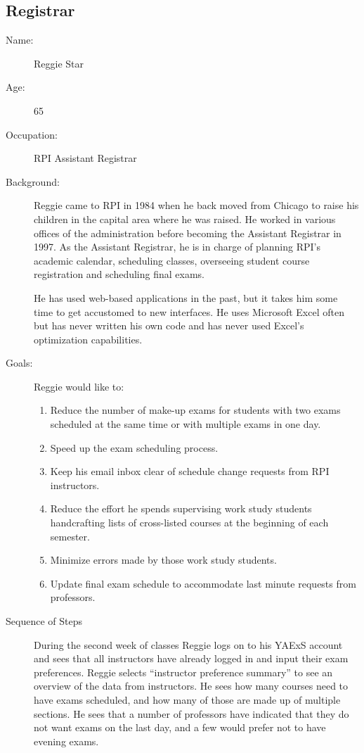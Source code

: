 \documentclass[11pt]{article}
\begin{document}
\subsection{Registrar}  %

\begin{description}
\item[Name:] Reggie Star
\item[Age:]  65
\item[Occupation:] RPI Assistant Registrar
\item[Background:] Reggie came to RPI in 1984 when he  back moved from
 Chicago to raise his children in the capital area where he was raised.
He worked in various offices of the administration before becoming
 the Assistant Registrar in 1997.  As the Assistant Registrar, he is in charge of planning RPI's academic calendar,  scheduling classes, overseeing student course registration and scheduling final exams.

He has used web-based applications in the past, but it takes him some
time to get accustomed to new interfaces.
He uses Microsoft Excel often but has never written his own code
 and has never used Excel’s optimization capabilities.

\item[Goals:]
Reggie would like to:
\begin{enumerate}
\item Reduce the number of make-up exams for students with two exams scheduled at the same time or with multiple exams in one day.
\item Speed up the exam scheduling process.
\item Keep his email inbox clear of schedule change requests from RPI instructors.
\item Reduce the effort he spends supervising work study students handcrafting lists of cross-listed courses at the beginning of each semester.
\item Minimize errors made by those work study students.
\item Update final exam schedule to accommodate last minute requests
from professors.
\end{enumerate}

\item[Sequence of Steps]
During the second week of classes Reggie logs on to his YAExS account and
 sees that all instructors have already logged in and input their
 exam preferences.
Reggie selects “instructor preference summary”  to see an overview of
 the data from instructors. He sees how many courses need to have exams
 scheduled, and how many of those are made up of multiple sections.
He sees that a number of professors have indicated that they do not
want exams on the last day, and a few would prefer not to have evening exams.


\end{description}
\end{document}
